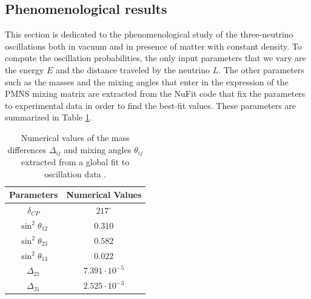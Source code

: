 \documentclass[twocolumn,secnumarabic,amssymb, nobibnotes, aps, prd,10pt]{revtex4-1}
\begin{document}
\subsection{Phenomenological results}
\label{subsec:results}

This section is dedicated to the phenomenological study of the three-neutrino oscillations
both in vacuum and in presence of matter with constant density. To compute the oscillation
probabilities, the only input parameters that we vary are the energy $E$ and the distance
traveled by the neutrino $L$. The other parameters such as the masses and the mixing angles
that enter in the expression of the PMNS mixing matrix are extracted from the NuFit code 
that fix the parameters to experimental data in order to find the best-fit values. These
parameters are summarized in Table \ref{tab:params}.
\begin{table}[!ht]
\centering
\begin{tabular}[t]{|c|c|}
\hline
\textbf{Parameters} 		& \textbf{Numerical Values} \\
\hline
$\delta_{CP}$			& $217^{\circ}$  \\
\hline
$\sin^2 \theta_{12}$		& $0.310$ \\
\hline
$\sin^2 \theta_{23}$		& $0.582$ \\
\hline
$\sin^2 \theta_{13}$		& $0.022$ \\
\hline
$\Delta_{21}$			& $7.391 \cdot 10^{-5}$ \\
\hline
$\Delta_{31}$			& $2.525 \cdot 10^{-3}$ \\
\hline
\end{tabular}
\caption{Numerical values of the mass differences $\Delta_{ij}$ and mixing angles
$\theta_{ij}$ extracted from a global fit to oscillation data \cite{Esteban:2018azc, }.}
\label{tab:params}
\end{table}
\end{document}
